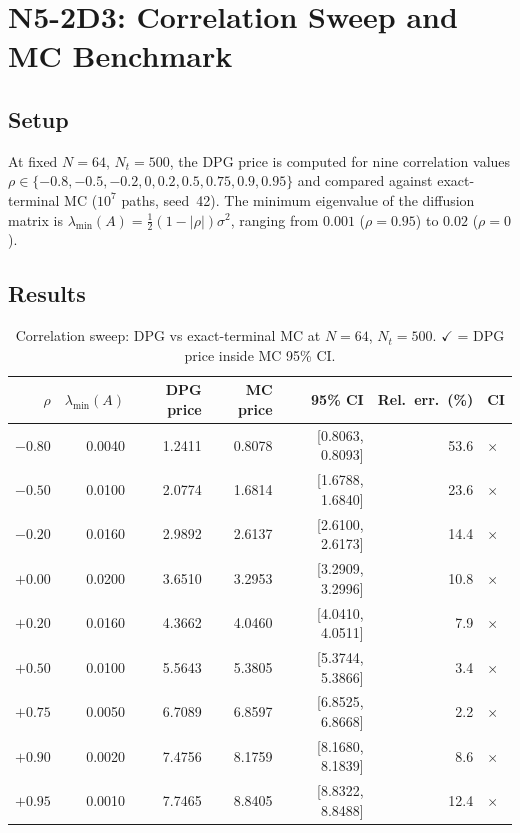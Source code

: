 \documentclass[11pt,a4paper]{article}
\begin{document}
\section{N5-2D3: Correlation Sweep and MC Benchmark}
\label{sec:corr}

\subsection{Setup}

At fixed $N=64$, $N_t=500$, the DPG price is computed for nine correlation
values $\rho\in\{-0.8,\allowbreak-0.5,\allowbreak-0.2,\allowbreak0,
\allowbreak0.2,\allowbreak0.5,\allowbreak0.75,\allowbreak0.9,
\allowbreak0.95\}$ and compared against exact-terminal MC ($10^7$ paths,
seed~42).  The minimum eigenvalue of the diffusion matrix is
$\lambda_{\min}(A) = \tfrac{1}{2}(1-|\rho|)\sigma^2$, ranging from
$0.001$ ($\rho=0.95$) to $0.02$ ($\rho=0$).

\subsection{Results}

\begin{table}[htbp]
\centering
\caption{Correlation sweep: DPG vs exact-terminal MC at $N=64$, $N_t=500$.
  $\checkmark$ = DPG price inside MC 95\% CI.}
\label{tab:corr}
\small
\begin{tabular}{r r r r r r l}
\toprule
$\rho$ & $\lambda_{\min}(A)$ & DPG price & MC price & 95\% CI & Rel.\ err.\ (\%) & CI \\
\midrule
$-0.80$ & 0.0040 & 1.2411 & 0.8078 & [0.8063, 0.8093] & 53.6 & $\times$ \\
$-0.50$ & 0.0100 & 2.0774 & 1.6814 & [1.6788, 1.6840] & 23.6 & $\times$ \\
$-0.20$ & 0.0160 & 2.9892 & 2.6137 & [2.6100, 2.6173] & 14.4 & $\times$ \\
$+0.00$ & 0.0200 & 3.6510 & 3.2953 & [3.2909, 3.2996] & 10.8 & $\times$ \\
$+0.20$ & 0.0160 & 4.3662 & 4.0460 & [4.0410, 4.0511] &  7.9 & $\times$ \\
$+0.50$ & 0.0100 & 5.5643 & 5.3805 & [5.3744, 5.3866] &  3.4 & $\times$ \\
$+0.75$ & 0.0050 & 6.7089 & 6.8597 & [6.8525, 6.8668] &  2.2 & $\times$ \\
$+0.90$ & 0.0020 & 7.4756 & 8.1759 & [8.1680, 8.1839] &  8.6 & $\times$ \\
$+0.95$ & 0.0010 & 7.7465 & 8.8405 & [8.8322, 8.8488] & 12.4 & $\times$ \\
\bottomrule
\end{tabular}
\end{table}
\end{document}
